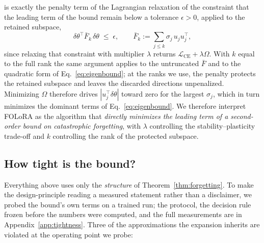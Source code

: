 is exactly the penalty term of the Lagrangian relaxation of the
constraint that the leading term of the bound remain below a tolerance $\epsilon>0$,
applied to the retained subspace,
\begin{equation}
\delta\theta^{\!\top}\bar{F}_k\,\delta\theta\;\le\;\epsilon ,
\qquad
\bar{F}_k:=\sum_{j\le k}\sigma_j\,u_j u_j^{\!\top},
\end{equation}
since relaxing that constraint with multiplier $\lambda$ returns
$\mathcal{L}_{\text{CE}}+\lambda\Omega$. With $k$ equal to the full rank the same
argument applies to the untruncated $\bar{F}$ and to the quadratic form of
Eq.~\eqref{eq:eigenbound}; at the ranks we use, the penalty protects the retained
subspace and leaves the discarded directions unpenalized. Minimizing $\Omega$ therefore drives
$|u_j^{\!\top}\delta\theta|$ toward zero for the largest $\sigma_j$, which in turn minimizes
the dominant terms of Eq.~\eqref{eq:eigenbound}. We therefore interpret FOLoRA as the
algorithm that \emph{directly minimizes the leading term of a second-order bound on
catastrophic forgetting}, with $\lambda$ controlling the stability--plasticity trade-off
and $k$ controlling the rank of the protected subspace.

\subsection{How tight is the bound?}
\label{sec:tightness}

Everything above uses only the \emph{structure} of Theorem~\ref{thm:forgetting}. To make the
design-principle reading a measured statement rather than a disclaimer, we probed the
bound's own terms on a trained run; the protocol, the decision rule frozen before the
numbers were computed, and the full measurements are in Appendix~\ref{app:tightness}. Three
of the approximations the expansion inherits are violated at the operating point we probe:

